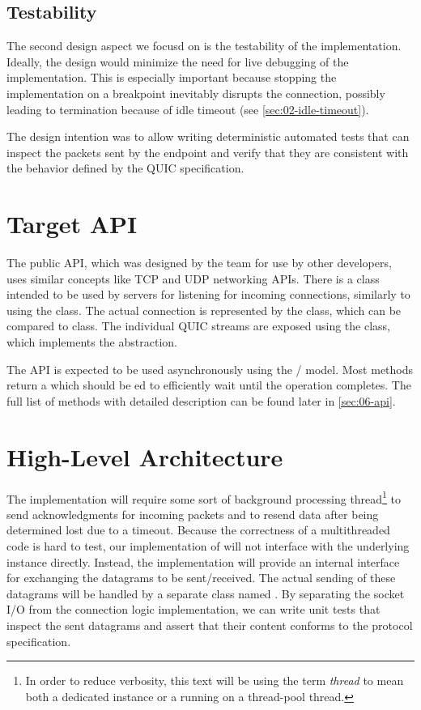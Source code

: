 \subsection{Testability}

The second design aspect we focusd on is the testability of the implementation. Ideally, the design
would minimize the need for live debugging of the implementation. This is especially important
because stopping the implementation on a breakpoint inevitably disrupts the connection, possibly
leading to termination because of idle timeout (see \autoref{sec:02-idle-timeout}).

The design intention was to allow writing deterministic automated tests that can inspect the packets
sent by the endpoint and verify that they are consistent with the behavior defined by the QUIC
specification.

\section{Target \dotnet{} API}

The public API, which was designed by the \dotnet{} team for use by other developers, uses similar
concepts like TCP and UDP \dotnet{} networking APIs. There is a \QuicListener{} class intended to be
used by servers for listening for incoming connections, similarly to using the 
class. The actual connection is represented by the \QuicConnection{} class, which can be compared to
 class. The individual QUIC streams are exposed using the \QuicStream{} class,
which implements the \Stream{} abstraction.

The API is expected to be used asynchronously using the / model. Most
methods return a \ValueTask{} which should be ed to efficiently wait until the
operation completes. The full list of methods with detailed description can be found later in
\autoref{sec:06-api}.

\section{High-Level Architecture}\label{sec:03-high-level-architecture}

The \QuicConnection{} implementation will require some sort of background processing
thread\footnote{In order to reduce verbosity, this text will be using the term \textit{thread} to
mean both a dedicated  instance or a  running on a thread-pool thread.} to
send acknowledgments for incoming packets and to resend data after being determined lost due to a
timeout. Because the correctness of a multithreaded code is hard to test, our implementation of
\QuicConnection{} will not interface with the underlying \Socket{} instance directly. Instead, the
implementation will provide an internal interface for exchanging the datagrams to be sent/received.
The actual sending of these datagrams will be handled by a separate class named
\QuicSocketContext{}. By separating the socket I/O from the connection logic implementation, we can
write unit tests that inspect the sent datagrams and assert that their content conforms to the
protocol specification.

